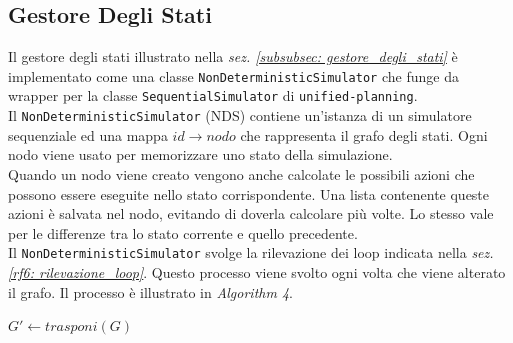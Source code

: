 \documentclass[a4paper, 11pt, titlepage, twoside, openany]{book}
\begin{document}
\subsection{Gestore Degli Stati}
Il gestore degli stati illustrato nella \textit{sez. \ref{subsubsec: gestore_degli_stati}} è implementato come una classe \texttt{NonDeterministicSimulator} che funge da wrapper per la classe \texttt{SequentialSimulator} di \texttt{unified-planning}. \\
Il \texttt{NonDeterministicSimulator} (NDS) contiene un'istanza di un simulatore sequenziale ed una mappa $id\to nodo$ che rappresenta il grafo degli stati. Ogni nodo viene usato per memorizzare uno stato della simulazione. \\
Quando un nodo viene creato vengono anche calcolate le possibili azioni che possono essere eseguite nello stato corrispondente. Una lista contenente queste azioni è salvata nel nodo, evitando di doverla calcolare più volte. Lo stesso vale per le differenze tra lo stato corrente e quello precedente. \\
Il \texttt{NonDeterministicSimulator} svolge la rilevazione dei loop indicata nella \textit{sez. \ref{rf6: rilevazione_loop}}. Questo processo viene svolto ogni volta che viene alterato il grafo. Il processo è illustrato in \textit{Algorithm 4}.

\begin{algorithm}
\caption{Rilevazione dei loop nel grafo degli stati}\label{alg:loop}
$G'\gets trasponi(G)$
\end{algorithm}
\end{document}
